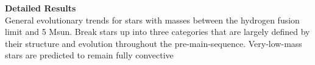\textbf{Detailed Results} \\
General evolutionary trends for stars with masses between the hydrogen fusion limit and 5 Msun. Break stars up into three categories that are largely defined by their structure and evolution throughout the pre-main-sequence. Very-low-mass stars are predicted to remain fully convective